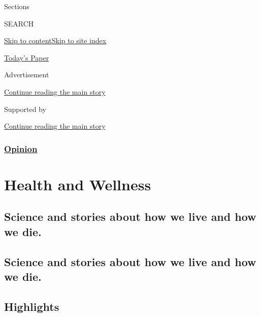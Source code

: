 Sections

SEARCH

\protect\hyperlink{site-content}{Skip to
content}\protect\hyperlink{site-index}{Skip to site index}

\href{https://myaccount.nytimes.com/auth/login?response_type=cookie\&client_id=vi}{}

\href{https://www.nytimes.com/section/todayspaper}{Today's Paper}

Advertisement

\protect\hyperlink{after-top}{Continue reading the main story}

Supported by

\protect\hyperlink{after-sponsor}{Continue reading the main story}

\hypertarget{opinion}{%
\subsubsection{\texorpdfstring{\href{/section/opinion}{Opinion}}{Opinion}}\label{opinion}}

\hypertarget{health-and-wellness}{%
\section{Health and Wellness}\label{health-and-wellness}}

\hypertarget{science-and-stories-about-how-we-live-and-how-we-die}{%
\subsection{Science and stories about how we live and how we
die.}\label{science-and-stories-about-how-we-live-and-how-we-die}}

\hypertarget{science-and-stories-about-how-we-live-and-how-we-die-1}{%
\subsection{Science and stories about how we live and how we
die.}\label{science-and-stories-about-how-we-live-and-how-we-die-1}}

\hypertarget{highlights}{%
\subsection{Highlights}\label{highlights}}

